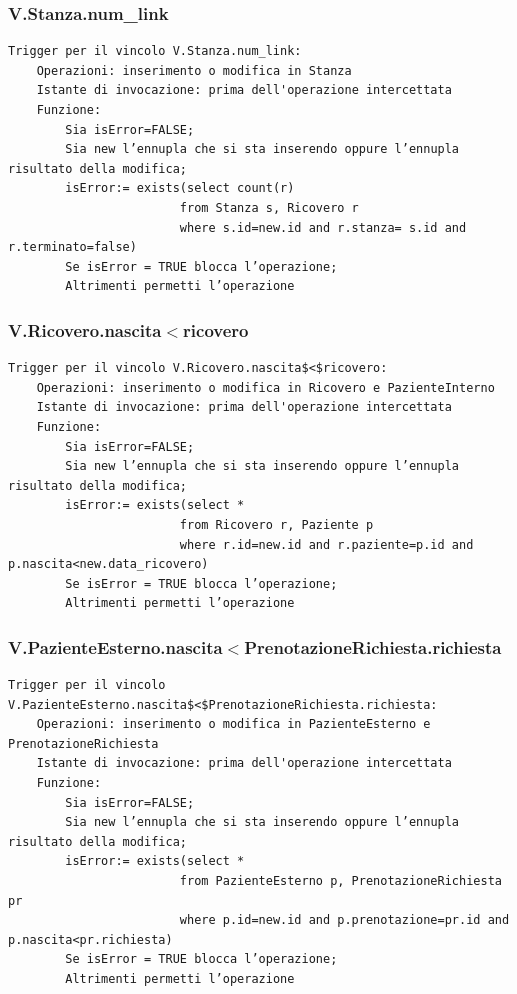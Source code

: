 \documentclass[12pt, letterpaper]{article}
\begin{document}
\subsubsection{V.Stanza.num\_link}
\begin{verbatim}
Trigger per il vincolo V.Stanza.num_link:
    Operazioni: inserimento o modifica in Stanza
    Istante di invocazione: prima dell'operazione intercettata
    Funzione:
        Sia isError=FALSE;
        Sia new l’ennupla che si sta inserendo oppure l’ennupla risultato della modifica;
        isError:= exists(select count(r)
                        from Stanza s, Ricovero r
                        where s.id=new.id and r.stanza= s.id and r.terminato=false)
        Se isError = TRUE blocca l’operazione;
        Altrimenti permetti l’operazione
\end{verbatim}
\subsubsection{V.Ricovero.nascita$<$ricovero}
\begin{verbatim}
Trigger per il vincolo V.Ricovero.nascita$<$ricovero:
    Operazioni: inserimento o modifica in Ricovero e PazienteInterno
    Istante di invocazione: prima dell'operazione intercettata
    Funzione:
        Sia isError=FALSE;
        Sia new l’ennupla che si sta inserendo oppure l’ennupla risultato della modifica;
        isError:= exists(select * 
                        from Ricovero r, Paziente p
                        where r.id=new.id and r.paziente=p.id and p.nascita<new.data_ricovero)
        Se isError = TRUE blocca l’operazione;
        Altrimenti permetti l’operazione
\end{verbatim}
\subsubsection{V.PazienteEsterno.nascita$<$PrenotazioneRichiesta.richiesta}
\begin{verbatim}
Trigger per il vincolo V.PazienteEsterno.nascita$<$PrenotazioneRichiesta.richiesta:
    Operazioni: inserimento o modifica in PazienteEsterno e PrenotazioneRichiesta
    Istante di invocazione: prima dell'operazione intercettata
    Funzione:
        Sia isError=FALSE;
        Sia new l’ennupla che si sta inserendo oppure l’ennupla risultato della modifica;
        isError:= exists(select * 
                        from PazienteEsterno p, PrenotazioneRichiesta pr
                        where p.id=new.id and p.prenotazione=pr.id and p.nascita<pr.richiesta)
        Se isError = TRUE blocca l’operazione;
        Altrimenti permetti l’operazione
\end{verbatim}\newpage
\end{document}
